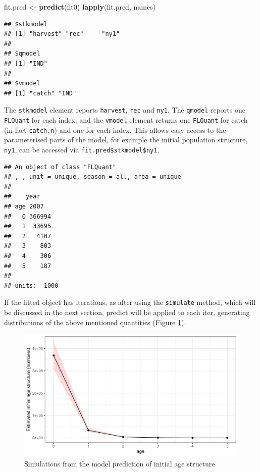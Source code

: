 \documentclass[
]{book}
\newenvironment{Shaded}{\begin{snugshade}}{\end{snugshade}}
\newcommand{\FunctionTok}[1]{\textcolor[rgb]{0.13,0.29,0.53}{\textbf{#1}}}
\newcommand{\NormalTok}[1]{#1}
\newcommand{\OtherTok}[1]{\textcolor[rgb]{0.56,0.35,0.01}{#1}}
\begin{document}
\begin{Shaded}
\begin{Highlighting}[]
\NormalTok{fit.pred }\OtherTok{\textless{}{-}} \FunctionTok{predict}\NormalTok{(fit0)}
\FunctionTok{lapply}\NormalTok{(fit.pred, names)}
\end{Highlighting}
\end{Shaded}

\begin{verbatim}
## $stkmodel
## [1] "harvest" "rec"     "ny1"    
## 
## $qmodel
## [1] "IND"
## 
## $vmodel
## [1] "catch" "IND"
\end{verbatim}

The \texttt{stkmodel} element reports \texttt{harvest}, \texttt{rec} and \texttt{ny1}. The \texttt{qmodel} reports one \texttt{FLQuant} for each index, and the \texttt{vmodel} element returns one \texttt{FLQuant} for catch (in fact \texttt{catch.n}) and one for each index. This allows easy access to the parameterised parts of the model, for example the initial population structure, \texttt{ny1}, can be accessed via \texttt{fit.pred\$stkmodel\$ny1}.

\begin{verbatim}
## An object of class "FLQuant"
## , , unit = unique, season = all, area = unique
## 
##    year
## age 2007  
##   0 366994
##   1  33695
##   2   4107
##   3    803
##   4    306
##   5    187
## 
## units:  1000
\end{verbatim}

If the fitted object has iterations, as after using the \texttt{simulate} method, which will be discussed in the next section, predict will be applied to each iter, generating distributions of the above mentioned quantities (Figure \ref{fig:simny1}).

\begin{figure}
\centering
\includegraphics{_bookdown_files/_main_files/figure-html/simny1-1.png}
\caption{\label{fig:simny1}Simulations from the model prediction of initial age structure}
\end{figure}
\end{document}
